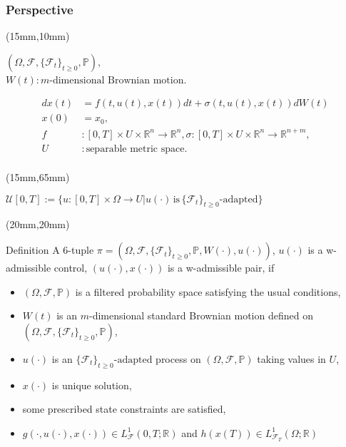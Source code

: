 \begin{frame}[plain]
	\frametitle{Perspective}
	\begin{textblock*}{100mm}(15mm,10mm)
		\begin{graybox}{}
			$(\Omega,\mathscr{F},\{\mathscr{F}_t\}_{t\geq 0},\mathbb{P})$,\\ $W(t):m\text{-dimensional Brownian motion}$.
			
			\begin{align*}
				dx(t)&=
				f(t,u(t),x(t))dt+\sigma(t,u(t),x(t))dW(t)\\
				x(0)&=
				x_0,\\
				f&:
				[0,T]\times U\times\mathbb{R}^n\rightarrow\mathbb{R}^n, \sigma:[0,T]\times U\times\mathbb{R}^n\rightarrow\mathbb{R}^{n+m},\\
				U&:
				\text{separable metric space}.\\
			\end{align*}
		\end{graybox}
	\end{textblock*}

	\begin{textblock*}{100mm}(15mm,65mm)
		\begin{yellowbox}{}
			$\mathcal{U}[0,T]:=\{u:[0,T]\times\Omega\rightarrow U | u(\cdot)\,\text{is}\,\{\mathscr{F}_t\}_{t\geq 0}\text{-adapted}\}$
		\end{yellowbox}
	\end{textblock*}
\end{frame}
\begin{frame}
	\begin{textblock*}{90mm}(20mm,20mm)
		\begin{graybox}{Definition}
			 A 6-tuple $\pi=(\Omega,\mathscr{F},\{\mathscr{F}_t\}_{t\geq 0},\mathbb{P},W(\cdot),u(\cdot))$, $u(\cdot)$ is  a w-admissible control, $(u(\cdot),x(\cdot))$ is a w-admissible pair, if
			\begin{itemize}
				\item $(\Omega,\mathscr{F},\mathbb{P})$ is a filtered probability space satisfying the usual conditions,
				\item $W(t)$ is an $m$-dimensional standard Brownian motion defined on $(\Omega,\mathscr{F},\{\mathscr{F}_t\}_{t\geq 0},\mathbb{P})$,
				\item $u(\cdot)$ is an $\{\mathscr{F}_t\}_{t\geq 0}\text{-adapted}$ process on $(\Omega,\mathscr{F},\mathbb{P})$ taking values in $U$,
				\item $x(\cdot)$ is unique solution,
				\item some prescribed state constraints are satisfied,
				\item $g(\cdot,u(\cdot),x(\cdot))\in L^1_{\mathscr{F}}(0,T;\mathbb{R})$ and $h(x(T))\in L^1_{\mathscr{F}_T}(\Omega;\mathbb{R})$
			\end{itemize}
		\end{graybox}
	\end{textblock*}
\end{frame}
